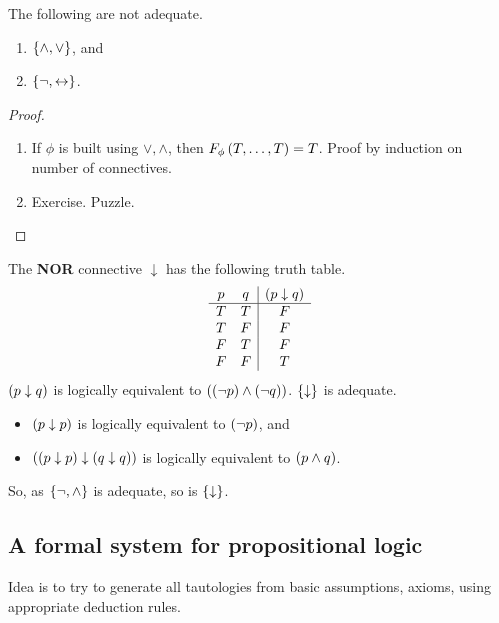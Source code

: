 \begin{example}
The following are not adequate.
\begin{enumerate}
\item $ \left\{ \land, \lor \right\} $, and
\item $ \left\{ \neg, \leftrightarrow \right\} $.
\end{enumerate}
\end{example}

\begin{proof}
\hfill
\begin{enumerate}
\item If $ \phi $ is built using $ \lor, \land $, then $ F_\phi\left( T, \dots, T \right) = T $. Proof by induction on number of connectives.
\item Exercise. Puzzle.
\end{enumerate}
\end{proof}

\begin{example}
The \textbf{NOR} connective $ \downarrow $ has the following truth table.
$$
\begin{array}{cc|c}
p & q & \left( p \downarrow q \right) \\
\hline
T & T & F \\
T & F & F \\
F & T & F \\
F & F & T
\end{array}
$$
$ \left( p \downarrow q \right) $ is logically equivalent to $ \left( \left( \neg p \right) \land \left( \neg q \right) \right) $. $ \left\{ \downarrow \right\} $ is adequate.
\begin{itemize}
\item $ \left( p \downarrow p \right) $ is logically equivalent to $ \left( \neg p \right) $, and
\item $ \left( \left( p \downarrow p \right) \downarrow \left( q \downarrow q \right) \right) $ is logically equivalent to $ \left( p \land q \right) $.
\end{itemize}
So, as $ \left\{ \neg, \land \right\} $ is adequate, so is $ \left\{ \downarrow \right\} $.
\end{example}

\pagebreak

\subsection{A formal system for propositional logic}

Idea is to try to generate all tautologies from basic assumptions, axioms, using appropriate deduction rules.

